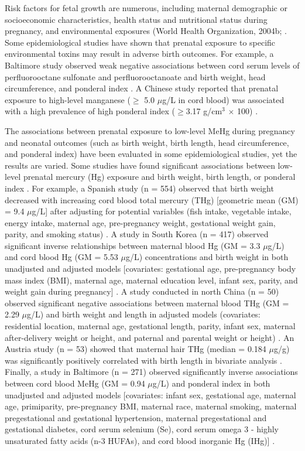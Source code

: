 Risk factors for fetal growth are numerous, including maternal demographic or socioeconomic characteristics, health status and nutritional status during pregnancy, and environmental exposures (World Health Organization, 2004b; \cite{de2004risk,triche2007environmental,barger2010maternal}. Some epidemiological studies have shown that prenatal exposure to specific environmental toxins may result in adverse birth outcomes. For example, a Baltimore study observed weak negative associations between cord serum levels of perfluorooctane sulfonate and perfluorooctanoate and birth weight, head circumference, and ponderal index \citep{apelberg2007cord}. A Chinese study reported that prenatal exposure to high-level manganese (${\ge}$ 5.0 ${\mu}$g/L in cord blood) was associated with a high prevalence of high ponderal index (${\ge}$3.17 g/cm$^{3}$ \({\times}\) 100) \citep{yu2013elevated}.

The associations between prenatal exposure to low-level MeHg during pregnancy and neonatal outcomes (such as birth weight, birth length, head circumference, and ponderal index) have been evaluated in some epidemiological studies, yet the results are varied. Some studies have found significant associations between low-level prenatal mercury (Hg) exposure and birth weight, birth length, or ponderal index \citep{wells2016cord,ramon2010fish,gundacker2010perinatal,lee2010interaction,ou2015low}. For example, a Spanish study (n = 554) observed that birth weight decreased with increasing cord blood total mercury (THg) [geometric mean (GM) = 9.4 ${\mu}$g/L] after adjusting for potential variables (fish intake, vegetable intake, energy intake, maternal age, pre-pregnancy weight, gestational weight gain, parity, and smoking status) \citep{ramon2010fish}. A study in South Korea (n = 417) observed significant inverse relationships between maternal blood Hg (GM = 3.3 ${\mu}$g/L) and cord blood Hg (GM = 5.53 ${\mu}$g/L) concentrations and birth weight in both unadjusted and adjusted models [covariates: gestational age, pre-pregnancy body mass index (BMI), maternal age, maternal education level, infant sex, parity, and weight gain during pregnancy] \citep{lee2010interaction}. A study conducted in north China (n = 50) observed significant negative associations
between maternal blood THg (GM = 2.29 ${\mu}$g/L) and birth weight and length in adjusted models (covariates: residential location, maternal age, gestational length, parity, infant sex, maternal after-delivery weight or height, and paternal and parental weight or height) \citep{ou2015low}. An Austria study (n = 53) showed that maternal hair THg (median = 0.184 ${\mu}$g/g) was significantly positively correlated with birth length in bivariate analysis \citep{gundacker2010perinatal}. Finally, a study in Baltimore (n = 271) observed significantly inverse associations between cord blood MeHg (GM = 0.94 ${\mu}$g/L) and ponderal index in both unadjusted and adjusted models [covariates: infant sex, gestational age, maternal age, primiparity, pre-pregnancy BMI, maternal race, maternal smoking, maternal pregestational and gestational hypertension, maternal pregestational and gestational diabetes, cord serum selenium (Se), cord serum omega 3 - highly unsaturated fatty acids (n-3 HUFAs), and cord blood inorganic Hg (IHg)] \citep{wells2016cord}.

